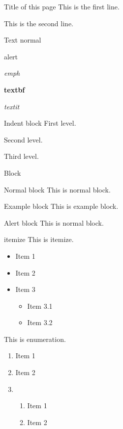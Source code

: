 \begin{frame}{Title of this page}
  This is the first line.\par
    \pause%
  This is the second line.
\end{frame}

\begin{frame}{Text}
  normal\par
  \alert{alert}\par
  \emph{emph}\par
  \textbf{textbf}\par
  \textit{textit}\par
\end{frame}

\begin{frame}{Indent block}
  First level.
  \pskip
  \begin{indentblock}
    Second level.
    \begin{indentblock}
      Third level.
    \end{indentblock}
  \end{indentblock}
\end{frame}

\begin{frame}{Block}
  \begin{block}{Normal block}
    This is normal block.
  \end{block}
  \begin{exampleblock}{Example block}
    This is example block.
  \end{exampleblock}
  \begin{alertblock}{Alert block}
    This is normal block.
  \end{alertblock}
\end{frame}

\begin{frame}{itemize}
    This is itemize.
    \begin{itemize}
      \item Item 1
      \item Item 2
      \item Item 3
            \begin{itemize}
              \item Item 3.1
              \item Item 3.2
            \end{itemize}
    \end{itemize}

    This is enumeration.
    \begin{enumerate}
      \item Item 1
      \item Item 2
      \item \begin{enumerate}
        \item Item 1
        \item Item 2
      \end{enumerate}
    \end{enumerate}
\end{frame}

